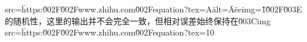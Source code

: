src=\"https:\u002F\u002Fwww.zhihu.com\u002Fequation?tex=A\" alt=\"A\" eeimg=\"1\"\u002F\u003E 的随机性，这里的输出并不会完全一致，但相对误差始终保持在\u003Cimg src=\"https:\u002F\u002Fwww.zhihu.com\u002Fequation?tex=10%